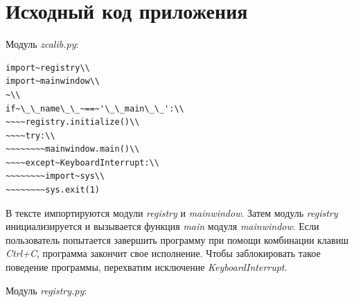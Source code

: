 \documentclass[a4paper,openany,twoside,draft]{book}
\providecommand*{\DUroletitlereference}[1]{\textsl{#1}}
\begin{document}
\section{Исходный код приложения%
  \label{id52}%
}

Модуль \DUroletitlereference{zcalib.py}:

\begin{verbatim}
import~registry\\
import~mainwindow\\
~\\
if~\_\_name\_\_~==~'\_\_main\_\_':\\
~~~~registry.initialize()\\
~~~~try:\\
~~~~~~~~mainwindow.main()\\
~~~~except~KeyboardInterrupt:\\
~~~~~~~~import~sys\\
~~~~~~~~sys.exit(1)
\end{verbatim}

В тексте импортируются модули \DUroletitlereference{registry} и \DUroletitlereference{mainwindow}.  Затем модуль
\DUroletitlereference{registry} инициализируется и вызывается функция \DUroletitlereference{main} модуля
\DUroletitlereference{mainwindow}.  Если пользователь попытается завершить программу при
помощи комбинации клавиш \DUroletitlereference{Ctrl+C}, программа закончит свое исполнение.
Чтобы заблокировать такое поведение программы, перехватим исключение
\DUroletitlereference{KeyboardInterrupt}.

Модуль \DUroletitlereference{registry.py}:
\end{document}
